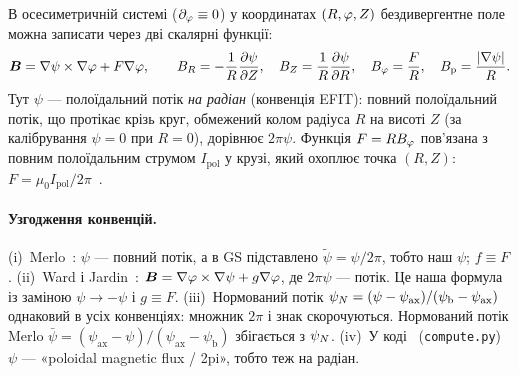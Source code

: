 В осесиметричній системі ($\partial_\varphi\equiv0$) у координатах $(R,\varphi,Z)$ бездивергентне поле можна записати через дві скалярні функції:
\begin{equation}\label{eq:03-B}
\bm{B}=\nabla\psi\times\nabla\varphi+F\nabla\varphi,\qquad B_{R}=-\frac{1}{R}\frac{\partial\psi}{\partial Z},\quad B_{Z}=\frac{1}{R}\frac{\partial\psi}{\partial R},\quad B_{\varphi}=\frac{F}{R},\quad B_{\mathrm{p}}=\frac{|\nabla\psi|}{R}.
\end{equation}
Тут $\psi$ --- полоїдальний потік \emph{на радіан} (конвенція EFIT): повний полоїдальний потік, що протікає крізь круг, обмежений колом радіуса $R$ на висоті $Z$ (за калібрування $\psi=0$ при $R=0$), дорівнює $2\pi\psi$. Функція $F=RB_{\varphi}$ пов'язана з повним полоїдальним струмом $I_{\mathrm{pol}}$ у крузі, який охоплює точка $(R,Z)$: $F=\mu_0I_{\mathrm{pol}}/2\pi$~\cite[с.~29]{Merlo2011}.

\paragraph{Узгодження конвенцій.} (i)~Merlo~\cite[с.~29--30]{Merlo2011}: $\psi$ --- повний потік, а в GS підставлено $\tilde\psi=\psi/2\pi$, тобто наш $\psi$; $f\equiv F$. (ii)~Ward і Jardin~\cite[с.~7]{Ward1992}: $\bm{B}=\nabla\varphi\times\nabla\psi+g\nabla\varphi$, де $2\pi\psi$ --- потік. Це наша формула із заміною $\psi\to-\psi$ і $g\equiv F$. (iii)~Нормований потік $\psi_{N}=(\psi-\psi_{\mathrm{ax}})/(\psi_{\mathrm{b}}-\psi_{\mathrm{ax}})$ однаковий в усіх конвенціях: множник $2\pi$ і знак скорочуються. Нормований потік Merlo $\bar\psi=(\psi_{\mathrm{ax}}-\psi)/(\psi_{\mathrm{ax}}-\psi_{\mathrm{b}})$ збігається з $\psi_{N}$. (iv)~У коді~\cite{ProjGSsolver} (\texttt{compute.py}) $\psi$ --- «poloidal magnetic flux / 2pi», тобто теж на радіан.

